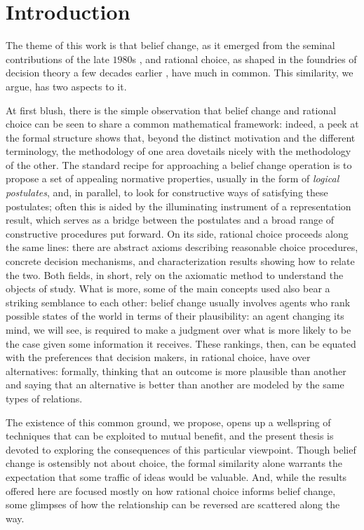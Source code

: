 \chapter{Introduction}\label{ch:1}

The theme of this work is that belief change,
as it emerged from the seminal contributions of the late $1980$s
\cite{AlchourronM85,AlchourronGM85,Gardenfors88},
and rational choice,
as shaped in the foundries of decision theory a few decades earlier
\cite{vonNeumannM44,Arrow51,Arrow59,Sen70,Suzumura83},
have much in common.
This similarity, we argue, has two aspects to it.

At first blush, there is the simple observation that 
belief change and rational choice
can be seen to share a common mathematical framework:
indeed, a peek at the formal structure
shows that, beyond the distinct motivation 
and the different terminology,
the methodology of one area dovetails nicely 
with the methodology of the other.
The standard recipe for approaching 
a belief change operation is 
to propose a set of appealing normative properties,
usually in the form of \emph{logical postulates},
and, in parallel, to look for constructive ways 
of satisfying these postulates;
often this is aided by the illuminating instrument 
of a representation result,
which serves as a bridge between the 
postulates and a broad range of constructive 
procedures put forward.
On its side, rational choice proceeds along the same lines:
there are abstract axioms describing reasonable choice procedures,
concrete decision mechanisms,
and characterization results showing how to relate the two.
Both fields, in short, rely on the axiomatic method to 
understand the objects of study.
What is more, some of the main concepts used also 
bear a striking semblance to each other:
belief change usually involves agents who rank possible states of 
the world in terms of their plausibility: 
an agent changing its mind, we will see, 
is required to make a judgment over what is more 
likely to be the case given some information it receives.
These rankings, then, can be equated 
with the preferences that decision makers, 
in rational choice, have over alternatives:
formally, thinking that an outcome is more plausible than another
and saying that an alternative is better than another
are modeled by the same types of relations.

The existence of this common ground, we propose,
opens up a wellspring of techniques that 
can be exploited to mutual benefit,
and the present thesis is devoted to exploring the
consequences of this particular viewpoint.
Though belief change is ostensibly not about choice,
the formal similarity alone warrants the expectation
that some traffic of ideas would be valuable.
And, while the results offered here are focused mostly 
on how rational choice informs belief change,
some glimpses of how the relationship can be reversed 
are scattered along the way.

